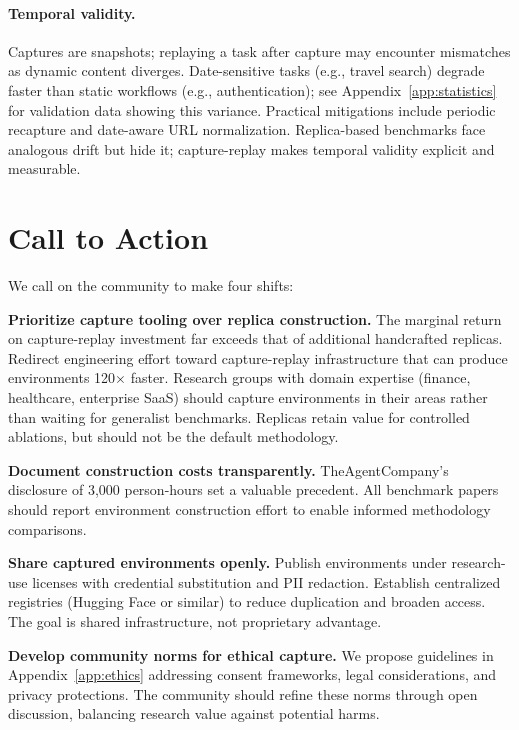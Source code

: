 \documentclass[letterpaper]{article}
\begin{document}
\paragraph{Temporal validity.} Captures are snapshots; replaying a task after capture may encounter mismatches as dynamic content diverges. Date-sensitive tasks (e.g., travel search) degrade faster than static workflows (e.g., authentication); see Appendix~\ref{app:statistics} for validation data showing this variance. Practical mitigations include periodic recapture and date-aware URL normalization. Replica-based benchmarks face analogous drift but hide it; capture-replay makes temporal validity explicit and measurable.


\section{Call to Action}
\label{sec:call}

We call on the community to make four shifts:

\textbf{Prioritize capture tooling over replica construction.} The marginal return on capture-replay investment far exceeds that of additional handcrafted replicas. Redirect engineering effort toward capture-replay infrastructure that can produce environments 120$\times$ faster. Research groups with domain expertise (finance, healthcare, enterprise SaaS) should capture environments in their areas rather than waiting for generalist benchmarks. Replicas retain value for controlled ablations, but should not be the default methodology.

\textbf{Document construction costs transparently.} TheAgentCompany's disclosure of 3,000 person-hours set a valuable precedent. All benchmark papers should report environment construction effort to enable informed methodology comparisons.

\textbf{Share captured environments openly.} Publish environments under research-use licenses with credential substitution and PII redaction. Establish centralized registries (Hugging Face or similar) to reduce duplication and broaden access. The goal is shared infrastructure, not proprietary advantage.

\textbf{Develop community norms for ethical capture.} We propose guidelines in Appendix~\ref{app:ethics} addressing consent frameworks, legal considerations, and privacy protections. The community should refine these norms through open discussion, balancing research value against potential harms.
\end{document}
